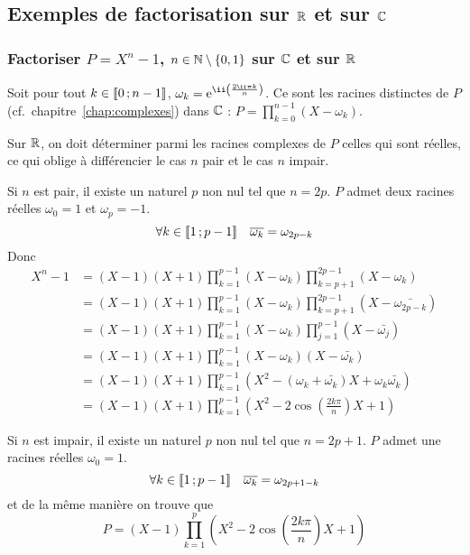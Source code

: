\subsection{Exemples de factorisation sur $\mathbb{R}$ et sur $\mathbb{C}$}

\subsubsection{Factoriser $P=X^n-1$, $n \in \mathbb{N}\setminus\{0,1\}$ sur $\mathbb{C}$ et sur $\mathbb{R}$}

Soit pour tout $k \in \mathopen{\llbracket}0\mathclose{}\mathpunct{};n-1\mathclose{\rrbracket}$, $\omega_k = \e^{\ii\left(\frac{2\ii \pi k}{n}\right)}$. Ce sont les racines distinctes de $P$ (cf.\ chapitre~\ref{chap:complexes}) dans $\mathbb{C}$ : $P = \prod_{k=0}^{n-1}(X-\omega_k)$.

Sur $\mathbb{R}$, on doit déterminer parmi les racines complexes de $P$ celles qui sont réelles, ce qui oblige à différencier le cas $n$ pair et le cas $n$ impair.

Si $n$ est pair, il existe un naturel $p$ non nul tel que $n=2p$. $P$ admet deux racines réelles $\omega_0=1$ et $\omega_p=-1$.
\begin{equation}
  \forall k \in \mathopen{\llbracket}1\mathclose{}\mathpunct{};p-1\mathclose{\rrbracket} \quad \overline{\omega_k}=\omega_{2p-k}
\end{equation}
Donc
\begin{align}
  X^n-1 &= (X-1)(X+1) \prod_{k=1}^{p-1} (X-\omega_k)\prod_{k=p+1}^{2p-1} (X-\omega_k) \\
  &=(X-1)(X+1) \prod_{k=1}^{p-1} (X-\omega_k) \prod_{k=p+1}^{2p-1} (X-\bar{\omega_{2p-k}})\\
  &=(X-1)(X+1) \prod_{k=1}^{p-1} (X-\omega_k) \prod_{j=1}^{p-1} (X-\bar{\omega_{j}})\\
  &=(X-1)(X+1) \prod_{k=1}^{p-1} (X-\omega_k)(X-\bar{\omega_{k}})\\
  &=(X-1)(X+1) \prod_{k=1}^{p-1} (X^2-(\omega_k+\bar{\omega_k})X+\omega_k\bar{\omega_k})\\
  &=(X-1)(X+1) \prod_{k=1}^{p-1} \left(X^2-2\cos\left(\frac{2k\pi}{n}\right)X+1\right)
\end{align}

Si $n$ est impair, il existe un naturel $p$ non nul tel que $n=2p+1$. $P$ admet une racines réelles $\omega_0=1$.
\begin{equation}
  \forall k \in \mathopen{\llbracket}1\mathclose{}\mathpunct{};p-1\mathclose{\rrbracket} \quad \overline{\omega_k}=\omega_{2p+1-k}
\end{equation}
et de la même manière on trouve que
\begin{equation}
  P=(X-1) \prod_{k=1}^{p} \left(X^2-2\cos\left(\frac{2k\pi}{n}\right)X+1\right)
\end{equation}

